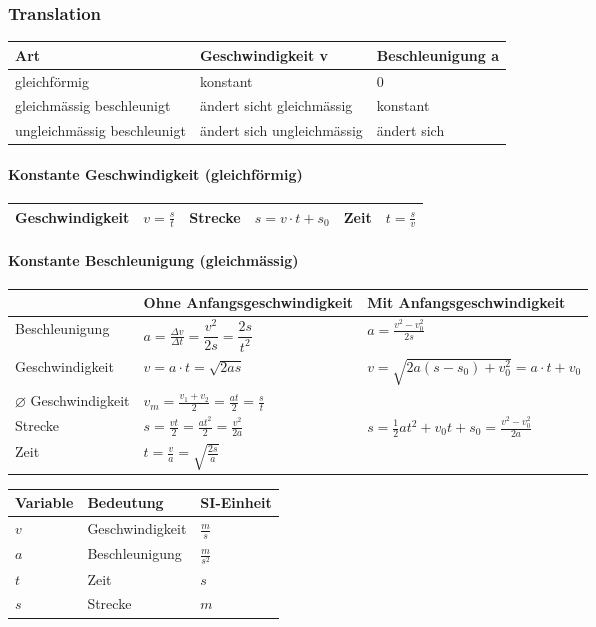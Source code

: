 \subsubsection{Translation}
\begin{tabbing}
	\begin{tabu} to \linewidth {X l l}
		\toprule
		Art & Geschwindigkeit v & Beschleunigung a \\
		\midrule
		gleichförmig & konstant & 0 \\
		gleichmässig beschleunigt & ändert sicht gleichmässig & konstant \\
		ungleichmässig beschleunigt & ändert sich ungleichmässig & ändert sich \\
	\end{tabu}
\end{tabbing}


\paragraph{Konstante Geschwindigkeit (gleichförmig)}

\begin{tabbing}
	\begin{tabu} to \linewidth {l X l X l X}
		\toprule
		Geschwindigkeit & $v = \frac{s}{t}$ &
		Strecke & $s = v \cdot t + s_0$ &
		Zeit & $t = \frac{s}{v}$ \\
		\bottomrule
	\end{tabu}
\end{tabbing}

\paragraph{Konstante Beschleunigung (gleichmässig)}

\begin{tabbing}
	\begin{tabu} to \linewidth {l X X}
		\toprule
		& Ohne Anfangsgeschwindigkeit & Mit Anfangsgeschwindigkeit \\
		\midrule
		Beschleunigung & 
		$a = \frac{\Delta v}{ \Delta t} = \dfrac{v^2}{2s} = \dfrac{2s}{t^2}$ &
		$a = \frac{v^2 - v_0^2}{2s}$ \\
		Geschwindigkeit & 
		$v = a \cdot t = \sqrt{2 a s}$ &
		$v = \sqrt{2a(s-s_0) + v_0^2} = a \cdot t + v_0 $ \\
		$\varnothing$ Geschwindigkeit & 
		$v_m = \frac{v_1 + v_2}{2} = \frac{at}{2} = \frac{s}{t}$ &
		 \\
		Strecke & 
		$s = \frac{v t}{2} = \frac{a t^2}{2} = \frac{v^2}{2a}$ &
		$s = \frac{1}{2} at^2 + v_0 t + s_0 = \frac{v^2 - v_0^2}{2a} $ \\
		Zeit & 
		$t = \frac{v}{a} = \sqrt{\frac{2s}{a}}$ & \\		
	\end{tabu}
\end{tabbing}

\begin{tabbing}
	\begin{tabu} to \linewidth {l X l}
		Variable & Bedeutung & SI-Einheit \\
		\midrule
		$v$ & Geschwindigkeit  & $\frac{m}{s}$ \\ 
		$a$ & Beschleunigung  & $\frac{m}{s^2}$ \\ 
		$t$ & Zeit  & $s$ \\ 
		$s$ & Strecke  & $m$ \\ 
		\bottomrule
	\end{tabu}
\end{tabbing}